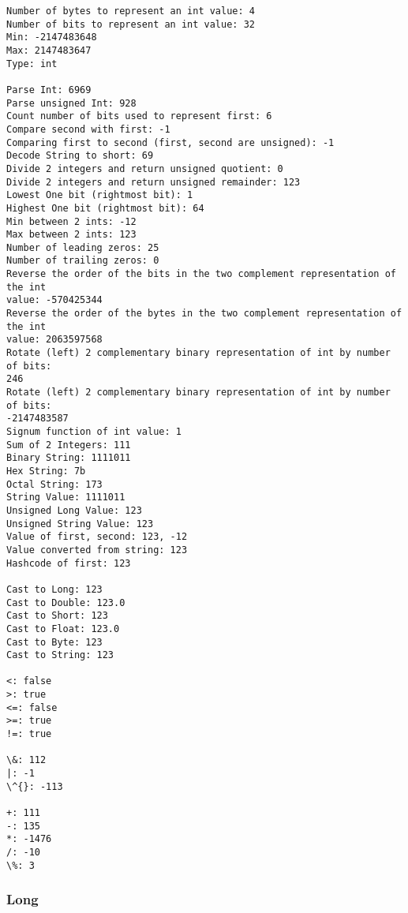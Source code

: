 \documentclass[9pt]{article}
\begin{document}
    \begin{Verbatim}[commandchars=\\\{\}]
Number of bytes to represent an int value: 4
Number of bits to represent an int value: 32
Min: -2147483648
Max: 2147483647
Type: int

Parse Int: 6969
Parse unsigned Int: 928
Count number of bits used to represent first: 6
Compare second with first: -1
Comparing first to second (first, second are unsigned): -1
Decode String to short: 69
Divide 2 integers and return unsigned quotient: 0
Divide 2 integers and return unsigned remainder: 123
Lowest One bit (rightmost bit): 1
Highest One bit (rightmost bit): 64
Min between 2 ints: -12
Max between 2 ints: 123
Number of leading zeros: 25
Number of trailing zeros: 0
Reverse the order of the bits in the two complement representation of the int
value: -570425344
Reverse the order of the bytes in the two complement representation of the int
value: 2063597568
Rotate (left) 2 complementary binary representation of int by number of bits:
246
Rotate (left) 2 complementary binary representation of int by number of bits:
-2147483587
Signum function of int value: 1
Sum of 2 Integers: 111
Binary String: 1111011
Hex String: 7b
Octal String: 173
String Value: 1111011
Unsigned Long Value: 123
Unsigned String Value: 123
Value of first, second: 123, -12
Value converted from string: 123
Hashcode of first: 123

Cast to Long: 123
Cast to Double: 123.0
Cast to Short: 123
Cast to Float: 123.0
Cast to Byte: 123
Cast to String: 123

<: false
>: true
<=: false
>=: true
!=: true

\&: 112
|: -1
\^{}: -113

+: 111
-: 135
*: -1476
/: -10
\%: 3
    \end{Verbatim}

    \hypertarget{long}{%
\subsubsection{Long}\label{long}}
\end{document}
